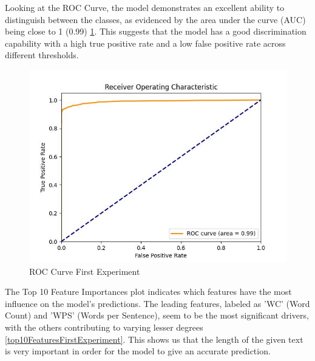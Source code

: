 Looking at the ROC Curve, the model demonstrates an excellent ability to distinguish between the classes, as evidenced by the area under the curve (AUC) being close to 1 (0.99) \ref{rocCurveFirstExperiment}. This suggests that the model has a good discrimination capability with a high true positive rate and a low false positive rate across different thresholds.

\begin{figure}[htbp]
	\centering
		\includegraphics[scale=0.6]{LaTeX Bachelor Thesis Depression Signs Detection/figures/metrics/experiment1English/roc_curve.jpg}
	\caption{ROC Curve First Experiment}
	\label{rocCurveFirstExperiment}
\end{figure}

The Top 10 Feature Importances plot indicates which features have the most influence on the model's predictions. The leading features, labeled as 'WC' (Word Count) and 'WPS' (Words per Sentence), seem to be the most significant drivers, with the others contributing to varying lesser degrees \ref{top10FeaturesFirstExperiment}. This shows us that the length of the given text is very important in order for the model to give an accurate prediction.


